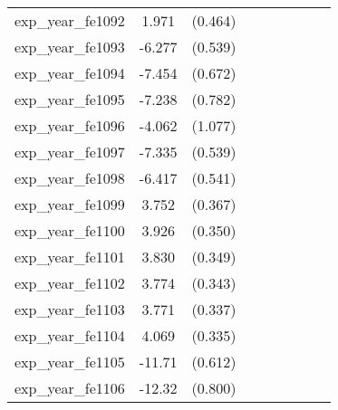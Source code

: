 {\begin{tabular}{l*{4}{cc}}
exp\_year\_fe1092&    1.971\sym{***}&  (0.464)&                  &         &                  &         &                  &         \\
exp\_year\_fe1093&   -6.277\sym{***}&  (0.539)&                  &         &                  &         &                  &         \\
exp\_year\_fe1094&   -7.454\sym{***}&  (0.672)&                  &         &                  &         &                  &         \\
exp\_year\_fe1095&   -7.238\sym{***}&  (0.782)&                  &         &                  &         &                  &         \\
exp\_year\_fe1096&   -4.062\sym{***}&  (1.077)&                  &         &                  &         &                  &         \\
exp\_year\_fe1097&   -7.335\sym{***}&  (0.539)&                  &         &                  &         &                  &         \\
exp\_year\_fe1098&   -6.417\sym{***}&  (0.541)&                  &         &                  &         &                  &         \\
exp\_year\_fe1099&    3.752\sym{***}&  (0.367)&                  &         &                  &         &                  &         \\
exp\_year\_fe1100&    3.926\sym{***}&  (0.350)&                  &         &                  &         &                  &         \\
exp\_year\_fe1101&    3.830\sym{***}&  (0.349)&                  &         &                  &         &                  &         \\
exp\_year\_fe1102&    3.774\sym{***}&  (0.343)&                  &         &                  &         &                  &         \\
exp\_year\_fe1103&    3.771\sym{***}&  (0.337)&                  &         &                  &         &                  &         \\
exp\_year\_fe1104&    4.069\sym{***}&  (0.335)&                  &         &                  &         &                  &         \\
exp\_year\_fe1105&   -11.71\sym{***}&  (0.612)&                  &         &                  &         &                  &         \\
exp\_year\_fe1106&   -12.32\sym{***}&  (0.800)&                  &         &                  &         &                  &         \\

\end{tabular}}

